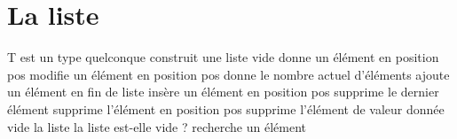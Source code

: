 	
\section*{La liste}
	
	\begin{LDA}
			\RComment T est un type quelconque
			\Public
					\RComment construit une liste vide
					\RComment donne un élément en position pos
					\RComment modifie un élément en position pos
					\RComment donne le nombre actuel d’éléments
					\RComment ajoute un élément en fin de liste
					\RComment insère un élément en position pos
					\RComment supprime le dernier élément
					\RComment supprime l'élément en position pos
					\RComment supprime l'élément de valeur donnée
					\RComment vide la liste
					\RComment la liste est-elle vide ?
					\RComment recherche un élément
		\EndClass
	\end{LDA}


